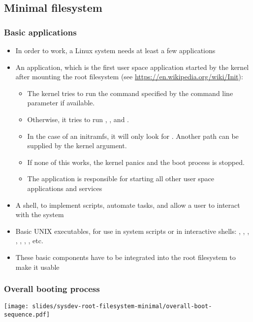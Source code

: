 \subsection{Minimal filesystem}
\begin{frame}
  \frametitle{Basic applications}
  \fontsize{10}{10}\selectfont
  \begin{itemize}
  \item In order to work, a Linux system needs at least a few
    applications
  \item An  application, which is the first user space
    application started by the kernel after mounting the root
    filesystem (see \url{https://en.wikipedia.org/wiki/Init}):
    \begin{itemize}
    \item The kernel tries to run the command specified by the
           command line parameter if available.
    \item Otherwise, it tries to run , ,
       and .
    \item In the case of an initramfs, it will only look for
      . Another path can be supplied by the 
      kernel argument.
    \item If none of this works, the kernel panics and the boot
      process is stopped.
    \item The  application is responsible for starting all other
      user space applications and services
    \end{itemize}
  \item A shell, to implement scripts, automate tasks, and allow a user
        to interact with the system
  \item Basic UNIX executables, for use in system scripts or in
        interactive shells: , , , ,
        , , , etc.
  \item These basic components have to be integrated into the root
    filesystem to make it usable
  \end{itemize}
\end{frame}

\begin{frame}
  \frametitle{Overall booting process}
  \begin{center}
    \texttt{[image: slides/sysdev-root-filesystem-minimal/overall-boot-sequence.pdf]}
  \end{center}
\end{frame}
